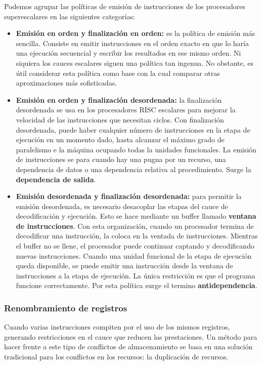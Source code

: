 Podemos agrupar las políticas de emisión de instrucciones de los procesadores superescalares en las siguientes categorías:

\begin{itemize}
  \item \textbf{Emisión en orden y finalización en orden:} es la política de emisión más sencilla. Consiste en emitir instrucciones en el orden exacto en que lo haría una ejecución secuencial y escribir los resultados en ese mismo orden. Ni siquiera los cauces escalares siguen una política tan ingenua. No obstante, es útil considerar esta política como base con la cual comparar otras aproximaciones más sofisticadas.
  \item \textbf{Emisión en orden y finalización desordenada:} la finalización desordenada se usa en los procesadores RISC escalares para mejorar la velocidad de las instrucciones que necesitan ciclos. Con finalización desordenada, puede haber cualquier número de instrucciones en la etapa de ejecución en un momento dado, hasta alcanzar el máximo grado de paralelismo e la máquina ocupando todas la unidades funcionales. La emisión de instrucciones se para cuando hay una pugna por un recurso, una dependencia de datos o una dependencia relativa al procedimiento. Surge la \textbf{dependencia de salida}.
  \item \textbf{Emisión desordenada y finalización desordenada:} para permitir la emisión desordenada, es necesario desacoplar las etapas del cauce de decodificación y ejecución. Esto se hace mediante un buffer llamado \textbf{ventana de instrucciones}. Con esta organización, cuando un procesador termina de decodificar una instrucción, la coloca en la ventada de instrucciones. Mientras el buffer no se llene, el procesador puede continuar captando y decodificando nuevas instrucciones. Cuando una unidad funcional de la etapa de ejecución queda disponible, se puede emitir una instrucción desde la ventana de instrucciones a la etapa de ejecución. La única restricción es que el programa funcione correctamente. Por esta política surge el termino \textbf{antidependencia}.
\end{itemize}

\subsubsection*{Renombramiento de registros}

Cuando varias instrucciones compiten por el uso de los mismos registros, generando restricciones en el cauce que reducen las prestaciones. Un método para hacer frente a este tipo de conflictos de almacenamiento se basa en una solución tradicional para los conflictos en los recursos: la duplicación de recursos.


